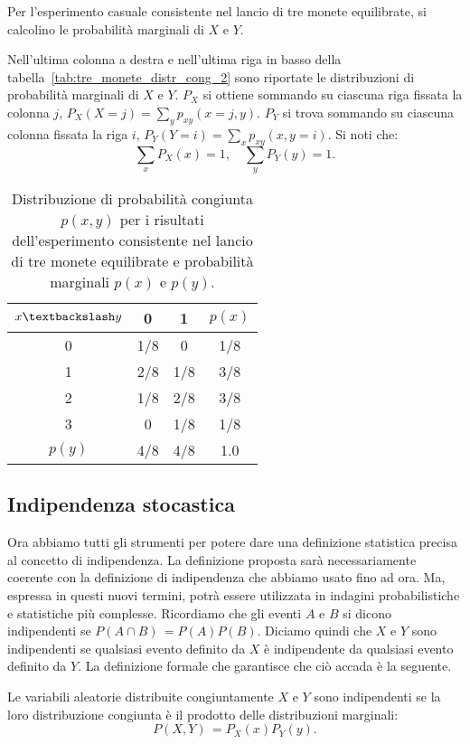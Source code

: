 \begin{exmp}
Per l'esperimento casuale consistente nel lancio di tre monete equilibrate, si calcolino le probabilità marginali di $X$ e $Y$.
\end{exmp}
\begin{solu}
Nell'ultima colonna a destra e nell'ultima riga in basso della tabella~\ref{tab:tre_monete_distr_cong_2} sono riportate le distribuzioni di probabilità marginali di $X$ e $Y$.
$P_X$ si ottiene sommando su ciascuna riga fissata la colonna $j$, $P_X(X = j) = \sum_y p_{xy}(x = j, y)$. 
$P_Y$ si trova sommando su ciascuna colonna fissata la riga $i$, $P_Y (Y = i) = \sum_x p_{xy}(x, y = i)$. 
Si noti che:
\[
\sum_x P_X(x) = 1, \quad \sum_y P_Y(y) = 1.
\]
\begin{table}[h!]
\caption{Distribuzione di probabilità congiunta $p(x,y)$ per i risultati dell'esperimento consistente nel lancio di tre monete equilibrate e probabilità marginali $p(x)$ e $p(y)$.}
\label{tab:tre_monete_distr_cong_2}
\begin{center}
\begin{tabular}{c|cc|c}
\toprule
$x\textbackslash y$ & 0 & 1 & $p(x)$\\
\midrule
0 & 1/8 & 0   & 1/8 \\
1 & 2/8 & 1/8 & 3/8\\
2 & 1/8 & 2/8 & 3/8 \\
3 & 0   & 1/8 & 1/8 \\
\midrule
$p(y)$ & 4/8 & 4/8 & 1.0\\
\bottomrule
\end{tabular}
\end{center}
\label{default}
\end{table}%
\end{solu}

\subsection{Indipendenza stocastica}

Ora abbiamo tutti gli strumenti per potere dare una definizione statistica precisa al concetto di indipendenza. 
La definizione proposta sarà necessariamente coerente con la definizione di indipendenza che abbiamo usato fino ad ora. 
Ma, espressa in questi nuovi termini, potrà essere utilizzata in indagini probabilistiche e statistiche più complesse. 
Ricordiamo che gli eventi $A$ e $B$ si dicono indipendenti se 
$
P (A \cap B)\, = P(A) P(B)
$.
Diciamo quindi che $X$ e $Y$ sono indipendenti se qualsiasi evento definito da $X$ è indipendente da qualsiasi evento definito da $Y$. 
La definizione formale che garantisce che ciò accada è la seguente. 
\begin{defn}
Le variabili aleatorie distribuite congiuntamente $X$ e $Y$ sono indipendenti se la loro distribuzione congiunta è il prodotto delle distribuzioni marginali:
\begin{equation}
P(X, Y)\, = P_X(x)P_Y(y).
\end{equation}
\end{defn}

